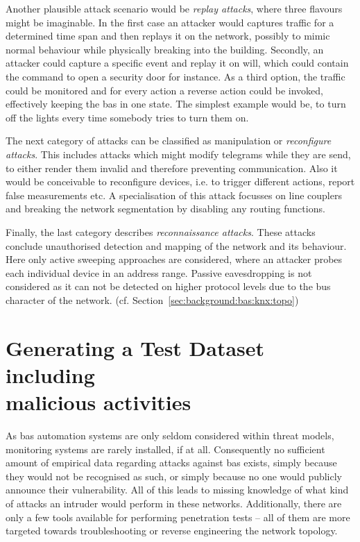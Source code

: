Another plausible attack scenario would be \emph{replay attacks}, where three flavours might be imaginable.
In the first case an attacker would captures traffic for a determined time span and then replays it on the network, possibly to mimic normal behaviour while physically breaking into the building.
Secondly, an attacker could capture a specific event and replay it on will, which could contain the command to open a security door for instance.
As a third option, the traffic could be monitored and for every action a reverse action could be invoked, effectively keeping the \gls{bas} in one state. The simplest example would be, to turn off the lights every time somebody tries to turn them on.

The next category of attacks can be classified as manipulation or \emph{reconfigure attacks}. This includes attacks which might modify telegrams while they are send, to either render them invalid and therefore preventing communication. Also it would be conceivable to reconfigure devices, i.e. to trigger different actions, report false measurements etc. A specialisation of this attack focusses on line couplers and breaking the network segmentation by disabling any routing functions.

Finally, the last category describes \emph{reconnaissance attacks}. These attacks conclude unauthorised detection and mapping of the network and its behaviour. Here only active sweeping approaches are considered, where an attacker probes each individual device in an address range.
Passive eavesdropping is not considered as it can not be detected on higher protocol levels due to the bus character of the network. (cf. Section~\ref{sec:background:bas:knx:topo})

\section[Generating a Test Dataset including malicious activities]{Generating a Test Dataset including\\ malicious activities}
\label{sec:methods:gen-test}

As \gls{bas} automation systems are only seldom considered within threat models, monitoring systems are rarely installed, if at all.
Consequently no sufficient amount of empirical data regarding attacks against \gls{bas} exists, simply because they would not be recognised as such, or simply because no one would publicly announce their vulnerability.
All of this leads to missing knowledge of what kind of attacks an intruder would perform in these networks.
Additionally, there are only a few tools available for performing penetration tests -- all of them are more targeted towards troubleshooting or reverse engineering the network topology.

